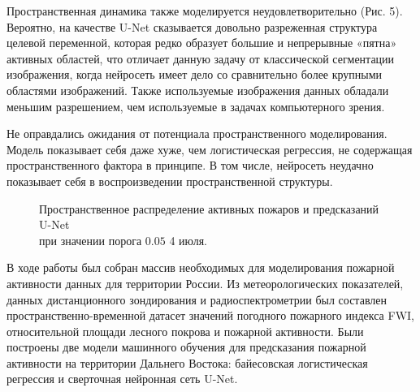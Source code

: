 \documentclass[a4paper,article,14pt]{extarticle}
\begin{document}
Пространственная динамика также моделируется неудовлетворительно (Рис. 5). Вероятно, на качестве U-Net сказывается довольно разреженная структура целевой переменной, которая редко образует большие и непрерывные «пятна» активных областей, что отличает данную задачу от классической сегментации изображения, когда нейросеть имеет дело со сравнительно более крупными областями изображений. Также используемые изображения данных обладали меньшим разрешением, чем используемые в задачах компьютерного зрения.

Не оправдались ожидания от потенциала пространственного моделирования. Модель показывает себя даже хуже, чем логистическая регрессия, не содержащая пространственного фактора в принципе. В том числе, нейросеть неудачно показывает себя в воспроизведении пространственной структуры.

\begin{figure}[ht]
\begin{center}
\caption{
\label{cinema}
	Пространственное распределение активных пожаров и предсказаний U-Net\\ при значении порога $0.05$ 4 июля.
}
\end {center}
\end {figure}

\pagebreak
{}

В ходе работы был собран массив необходимых для моделирования пожарной активности данных для территории России. Из метеорологических показателей, данных дистанционного зондирования и радиоспектрометрии был составлен пространственно-временной датасет значений погодного пожарного индекса FWI, относительной площади лесного покрова и пожарной активности. Были построены две модели машинного обучения для предсказания пожарной активности на территории Дальнего Востока: байесовская логистическая регрессия и сверточная нейронная сеть U-Net.
\end{document}
